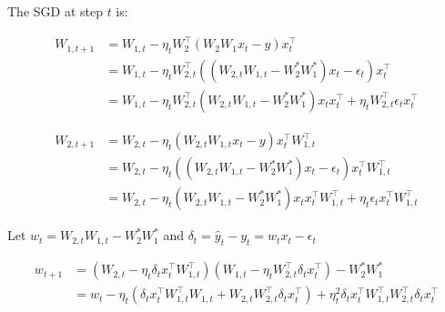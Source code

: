 \documentclass{article}
\begin{document}
\bigskip

The SGD at step $t$ is:

\begin{align*}
W_{1,t+1} &= W_{1,t} - \eta_t  W_2^\top(W_2 W_1x_t - y)x_t^\top
\\&=
W_{1,t} - \eta_t  W_{2,t}^\top((W_{2,t} W_{1,t}-W_2^*W_1^*)x_t  - \epsilon_t )x_t ^\top
\\&=
W_{1,t} - \eta_t  W_{2,t}^\top(W_{2,t} W_{1,t}-W_2^*W_1^*)x_t x_t ^\top + \eta_t W_{2,t}^\top \epsilon_t  x_t ^\top
\end{align*}

\begin{align*}
W_{2,t+1} &= W_{2,t} - \eta_t  (W_{2,t} W_{1,t}x_t  - y )x_t ^\top W_{1,t}^\top
\\&=
W_{2,t} - \eta_t ((W_{2,t} W_{1,t}-W_2^*W_1^*)x_t  - \epsilon_t )x_t ^\top  W_{1,t}^\top
\\&=
W_{2,t} - \eta_t  (W_{2,t} W_{1,t}-W_2^*W_1^*)x_t x_t ^\top W_{1,t}^\top + \eta_t  \epsilon_t  x_t ^\top W_{1,t}^\top
\end{align*}

Let $w_t = W_{2,t} W_{1,t}-W_2^*W_1^*$ and $\delta_t = \hat y_t - y_t =  w_t x_t - \epsilon_t$



\begin{align*}
w_{t+1}
&= (W_{2,t} - \eta_t  \delta_t x_t ^\top W_{1,t}^\top)(W_{1,t} - \eta_t  W_{2,t}^\top \delta_t x_t ^\top) - W_2^*W_1^*
\\&=
w_t - \eta_t(\delta_t x_t ^\top W_{1,t}^\top  W_{1,t} + W_{2,t} W_{2,t}^\top \delta_t x_t ^\top) + \eta_t^2 \delta_t x_t ^\top W_{1,t}^\top W_{2,t}^\top \delta_t x_t ^\top
\end{align*}
\end{document}
